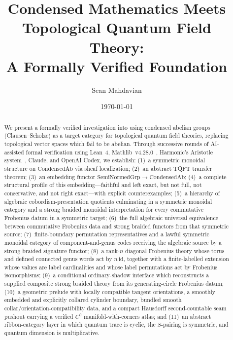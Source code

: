 \documentclass[11pt]{amsart}
\title[Liquid TQFT]{Condensed Mathematics Meets Topological Quantum Field Theory:\\A Formally Verified Foundation}
\author{Sean Mahdavian}
\date{\today}
\theoremstyle{plain}
\theoremstyle{definition}
\newcommand{\CondAb}{\mathrm{CondensedAb}}
\newcommand{\SemiNormedGrp}{\mathrm{SemiNormedGrp}}
\newcommand{\id}{\mathrm{id}}
\begin{document}
\begin{abstract}
We present a formally verified investigation into using condensed abelian groups (Clausen--Scholze) as a target category for topological quantum field theories, replacing topological vector spaces which fail to be abelian. Through successive rounds of AI-assisted formal verification using Lean~4, Mathlib~v4.28.0~\cite{Mathlib}, Harmonic's Aristotle system~\cite{Aristotle2025}, Claude, and OpenAI Codex, we establish: (1)~a symmetric monoidal structure on $\CondAb$ via sheaf localization; (2)~an abstract TQFT transfer theorem; (3)~an embedding functor $\SemiNormedGrp \to \CondAb$; (4)~a complete structural profile of this embedding---faithful and left exact, but not full, not conservative, and not right exact---with explicit counterexamples; (5)~a hierarchy of algebraic cobordism-presentation quotients culminating in a symmetric monoidal category and a strong braided monoidal interpretation for every commutative Frobenius datum in a symmetric target; (6)~the full algebraic universal equivalence between commutative Frobenius data and strong braided functors from that symmetric source; (7)~finite-boundary permutation representatives and a lawful symmetric monoidal category of component-and-genus codes receiving the algebraic source by a strong braided signature functor; (8)~a rank-$n$ diagonal Frobenius theory whose torus and defined connected genus words act by $n\,\id$, together with a finite-labelled extension whose values are label cardinalities and whose label permutations act by Frobenius isomorphisms; (9)~a conditional ordinary-shadow interface which reconstructs a supplied composite strong braided theory from its generating-circle Frobenius datum; (10)~a geometric prelude with locally compatible tangent orientations, a smoothly embedded and explicitly collared cylinder boundary, bundled smooth collar/orientation-compatibility data, and a compact Hausdorff second-countable seam pushout carrying a verified $C^0$ manifold-with-corners atlas; and (11)~an abstract ribbon-category layer in which quantum trace is cyclic, the $S$-pairing is symmetric, and quantum dimension is multiplicative.


\end{abstract}
\end{document}
